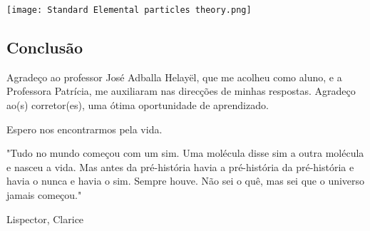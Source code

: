 \documentclass{article}
\begin{document}





\begin{center}
    \texttt{[image: Standard Elemental particles theory.png]}
\end{center}


\newpage
\begin{center}
 \section*{Conclusão}
 Agradeço ao professor José Adballa Helayël, que me acolheu como aluno, e a Professora Patrícia, me auxiliaram nas direcções de minhas respostas.
Agradeço ao(s) corretor(es), uma ótima oportunidade de aprendizado.

Espero nos encontrarmos pela vida.

\vspace{5mm}

  {\selectfont
"Tudo no mundo começou com um sim. Uma molécula disse sim a outra molécula e nasceu a vida. Mas antes da pré-história havia a pré-história da pré-história e havia o nunca e havia o sim. Sempre houve. Não sei o quê, mas sei que o universo jamais começou."

\vspace{3mm}
Lispector, Clarice
}
   
\end{center}

\newpage
\end{document}
